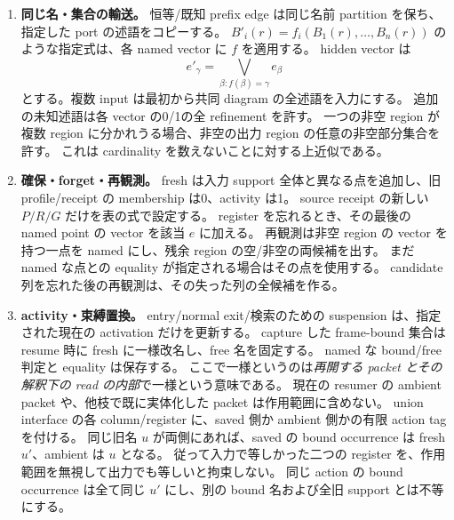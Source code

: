 \documentclass[11pt,a4paper]{article}
\begin{document}
\begin{enumerate}
\item \textbf{同じ名・集合の輸送。}
恒等/既知 prefix edge は同じ名前 partition を保ち、指定した port の述語をコピーする。
\(B'_i(r)=f_i(B_1(r),\ldots,B_n(r))\) のような指定式は、各 named vector に \(f\) を適用する。
hidden vector は
\[
 e'_{\gamma}=\bigvee_{\beta:f(\beta)=\gamma}e_\beta
\]
とする。複数 input は最初から共同 diagram の全述語を入力にする。
追加の未知述語は各 vector の0/1の全 refinement を許す。
一つの非空 region が複数 region に分かれうる場合、非空の出力 region の任意の非空部分集合を許す。
これは cardinality を数えないことに対する上近似である。
\item \textbf{確保・forget・再観測。}
fresh は入力 support 全体と異なる点を追加し、旧 profile/receipt の membership は0、activity は1。
source receipt の新しい \(P/R/G\) だけを表の式で設定する。
register を忘れるとき、その最後の named point の vector を該当 \(e\) に加える。
再観測は非空 region の vector を持つ一点を named にし、残余 region の空/非空の両候補を出す。
まだ named な点との equality が指定される場合はその点を使用する。
candidate 列を忘れた後の再観測は、その失った列の全候補を作る。
\item \textbf{activity・束縛置換。}
entry/normal exit/検索のための suspension は、指定された現在の activation だけを更新する。
capture した frame-bound 集合は resume 時に fresh に一様改名し、free 名を固定する。
named な bound/free 判定と equality は保存する。
ここで一様というのは\emph{再開する packet とその解釈下の read の内部}で一様という意味である。
現在の resumer の ambient packet や、他枝で既に実体化した packet は作用範囲に含めない。
union interface の各 column/register に、saved 側か ambient 側かの有限 action tag を付ける。
同じ旧名 \(u\) が両側にあれば、saved の bound occurrence は fresh \(u'\)、ambient は \(u\) となる。
従って入力で等しかった二つの register を、作用範囲を無視して出力でも等しいと拘束しない。
同じ action の bound occurrence は全て同じ \(u'\) にし、別の bound 名および全旧 support とは不等にする。


\end{enumerate}
\end{document}
